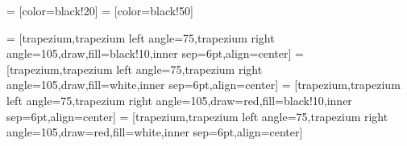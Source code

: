  = [color=black!20]
 = [color=black!50]


%

 = [trapezium,trapezium left angle=75,trapezium right angle=105,draw,fill=black!10,inner sep=6pt,align=center]
 = [trapezium,trapezium left angle=75,trapezium right angle=105,draw,fill=white,inner sep=6pt,align=center]
 = [trapezium,trapezium left angle=75,trapezium right angle=105,draw=red,fill=black!10,inner sep=6pt,align=center]
 = [trapezium,trapezium left angle=75,trapezium right angle=105,draw=red,fill=white,inner sep=6pt,align=center]


